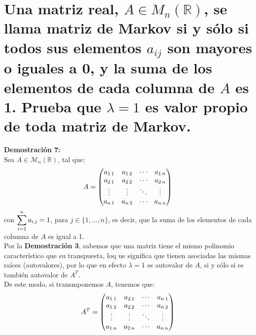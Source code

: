 \section{Una matriz real, $A \in M_n(\mathbb{R})$, se llama matriz de Markov si y sólo si todos sus elementos $a_{ij}$ son mayores o iguales a 0, y la suma de los elementos de cada columna de $A$ es 1. Prueba que $\lambda =1$ es valor propio de toda matriz de Markov.\\}
\textbf{Demostraci\'on 7:}\\
Sea $A\in\mathcal{M}_n(\mathbb{R})$, tal que:
\[A= \begin{pmatrix}
	a_{1\hspace{0.5mm}1} & a_{1\hspace{0.5mm}2} &\cdots& a_{1\hspace{0.5mm}n} \\
	a_{2\hspace{0.5mm}1} & a_{2\hspace{0.5mm}2} &\cdots& a_{2\hspace{0.5mm}n} \\\vdots&\vdots&\ddots&\vdots\\
	a_{n\hspace{0.5mm}1} & a_{n\hspace{0.5mm}2} &\cdots& a_{n\hspace{0.5mm}n} \end{pmatrix}\]
con $\displaystyle \sum_{i=1}^n a_{i\hspace{0.5mm}j}=1$, para $j\in\{1,\dots,n\}$, es decir, que la suma de los elementos de cada columna de $A$ es igual a 1.\\
Por la \textbf{Demostraci\'on 3}, sabemos que una matriz tiene el mismo polinomio caracter\'istico que su transpuesta, loq ue significa que tienen asociadas las mismas ra\'ices (autovalores), por lo que en efecto $\lambda=1$ es autovalor de $A$, si y s\'olo si es tambi\'en autovalor de $A^T$.\\
De este modo, si transmponemos $A$, tenemos que:
\[A^T= \begin{pmatrix}
	a_{1\hspace{0.5mm}1} & a_{2\hspace{0.5mm}1} &\cdots& a_{n\hspace{0.5mm}1} \\
	a_{1\hspace{0.5mm}2} & a_{2\hspace{0.5mm}2} &\cdots& a_{n\hspace{0.5mm}2} \\\vdots&\vdots&\ddots&\vdots\\
	a_{1\hspace{0.5mm}n} & a_{2\hspace{0.5mm}n} &\cdots& a_{n\hspace{0.5mm}n} \end{pmatrix}\]
	
